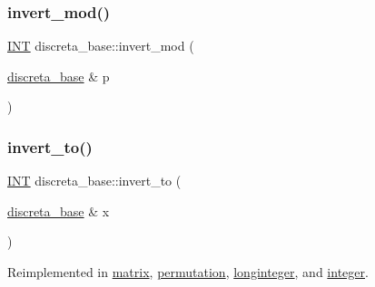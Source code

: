 \mbox{\label{classdiscreta__base_ae730a9ba3ebdb5ac13685ea86d93aec0}} 
\subsubsection{\texorpdfstring{invert\+\_\+mod()}{invert\_mod()}}
{\footnotesize\ttfamily \mbox{\hyperlink{galois_8h_a09fddde158a3a20bd2dcadb609de11dc}{I\+NT}} discreta\+\_\+base\+::invert\+\_\+mod (\begin{DoxyParamCaption}\item[{\mbox{\hyperlink{classdiscreta__base}{discreta\+\_\+base}} \&}]{p }\end{DoxyParamCaption})}

\mbox{\label{classdiscreta__base_a874a5ffb467f3896604a3c9bdf0cca50}} 
\subsubsection{\texorpdfstring{invert\+\_\+to()}{invert\_to()}}
{\footnotesize\ttfamily \mbox{\hyperlink{galois_8h_a09fddde158a3a20bd2dcadb609de11dc}{I\+NT}} discreta\+\_\+base\+::invert\+\_\+to (\begin{DoxyParamCaption}\item[{\mbox{\hyperlink{classdiscreta__base}{discreta\+\_\+base}} \&}]{x }\end{DoxyParamCaption})\hspace{0.3cm}{\ttfamily [virtual]}}



Reimplemented in \mbox{\hyperlink{classmatrix_a137bc3b88c71382c675dea7a0bf9b5f2}{matrix}}, \mbox{\hyperlink{classpermutation_a1209ecbc8fdb0320a38218bd0c15c5fa}{permutation}}, \mbox{\hyperlink{classlonginteger_ab60c9e3b2f28caf83f3b13d6f3a9ec54}{longinteger}}, and \mbox{\hyperlink{classinteger_a9a991b285677b99b4879034e31648b7a}{integer}}.

\mbox{\label{classdiscreta__base_ae6cf39d4b122ec93866ae59607b15350}} 
